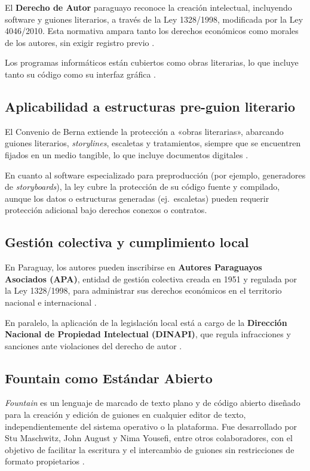 \documentclass[12pt]{article}
\begin{document}
	{\sloppy
		El \textbf{Derecho de Autor} paraguayo reconoce la creación intelectual, incluyendo software y guiones literarios, a través de la Ley 1328/1998, modificada por la Ley 4046/2010. Esta normativa ampara tanto los derechos económicos como morales de los autores, sin exigir registro previo \parencite{wipo_paraguay}.
	}

	Los programas informáticos están cubiertos como obras literarias, lo que incluye tanto su código como su interfaz gráfica \parencite{njq_paraguay,paraguay_software1998}.

	\subsection{Aplicabilidad a estructuras pre-guion literario}

	El Convenio de Berna extiende la protección a «obras literarias», abarcando guiones literarios, \textit{storylines}, escaletas y tratamientos, siempre que se encuentren fijados en un medio tangible, lo que incluye documentos digitales \parencite{berne2025}.

	En cuanto al software especializado para preproducción (por ejemplo, generadores de \textit{storyboards}), la ley cubre la protección de su código fuente y compilado, aunque los datos o estructuras generadas (ej.\ escaletas) pueden requerir protección adicional bajo derechos conexos o contratos.

	\subsection{Gestión colectiva y cumplimiento local}

	En Paraguay, los autores pueden inscribirse en \textbf{Autores Paraguayos Asociados (APA)}, entidad de gestión colectiva creada en 1951 y regulada por la Ley 1328/1998, para administrar sus derechos económicos en el territorio nacional e internacional \parencite{apa_py}.

	En paralelo, la aplicación de la legislación local está a cargo de la \textbf{Dirección Nacional de Propiedad Intelectual (DINAPI)}, que regula infracciones y sanciones ante violaciones del derecho de autor \parencite{ip_office_py}.

	\subsection{Fountain como Estándar Abierto}

	\textit{Fountain} es un lenguaje de marcado de texto plano y de código abierto diseñado para la creación y edición de guiones en cualquier editor de texto, independientemente del sistema operativo o la plataforma. Fue desarrollado por Stu Maschwitz, John August y Nima Yousefi, entre otros colaboradores, con el objetivo de facilitar la escritura y el intercambio de guiones sin restricciones de formato propietarios \parencite{fountain_wikipedia, fountain_official}.
\end{document}
